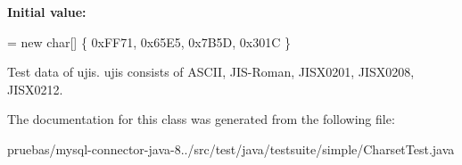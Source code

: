 {\bfseries Initial value\+:}
\begin{DoxyCode}
= \textcolor{keyword}{new} \textcolor{keywordtype}{char}[] \{ 0xFF71, 
            0x65E5, 
            0x7B5D, 
            0x301C 
    \}
\end{DoxyCode}
Test data of ujis. ujis consists of A\+S\+C\+II, J\+I\+S-\/\+Roman, J\+I\+S\+X0201, J\+I\+S\+X0208, J\+I\+S\+X0212. 

The documentation for this class was generated from the following file\+:\begin{DoxyCompactItemize}
\item 
pruebas/mysql-\/connector-\/java-\/8../src/test/java/testsuite/simple/Charset\+Test.\+java\end{DoxyCompactItemize}
